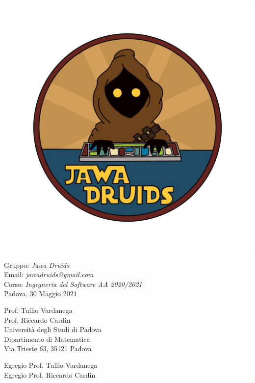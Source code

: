 \documentclass[a4paper,12pt]{report}
\begin{document}
\mbox{}
\vspace{-4cm}
\begin{center}
  \includegraphics[width=0.6\linewidth]{immagini/DRUIDSLOGO.jpg}
\end{center}
Gruppo: \textit{Jawa Druids} \\ Email: \textit{jawadruids@gmail.com}\\ Corso: \textit{Ingegneria del Software AA 2020/2021}\\Padova, 30 Maggio 2021 \\
\begin{flushright}
  Prof. Tullio Vardanega \\
  Prof. Riccardo Cardin \\
  Università degli Studi di Padova \\
  Dipartimento di Matematica \\
  Via Trieste 63, 35121 Padova \\
\end{flushright}
Egregio Prof. Tullio Vardanega \\
Egregio Prof. Riccardo Cardin \\
\vspace{0.2cm}
\end{document}

